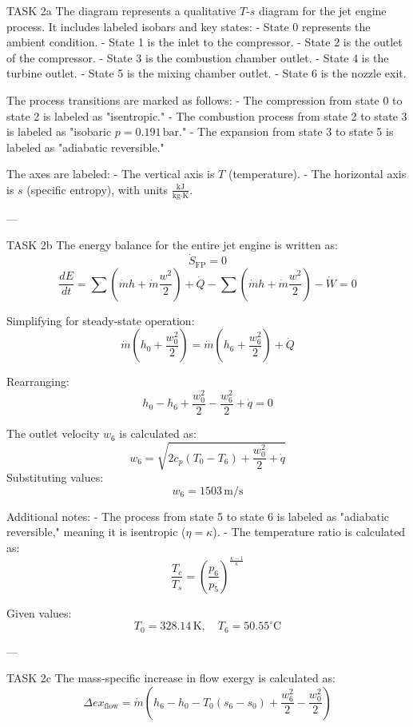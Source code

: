 TASK 2a  
The diagram represents a qualitative \( T \)-\( s \) diagram for the jet engine process. It includes labeled isobars and key states:  
- State 0 represents the ambient condition.  
- State 1 is the inlet to the compressor.  
- State 2 is the outlet of the compressor.  
- State 3 is the combustion chamber outlet.  
- State 4 is the turbine outlet.  
- State 5 is the mixing chamber outlet.  
- State 6 is the nozzle exit.  

The process transitions are marked as follows:  
- The compression from state 0 to state 2 is labeled as "isentropic."  
- The combustion process from state 2 to state 3 is labeled as "isobaric \( p = 0.191 \, \text{bar} \)."  
- The expansion from state 3 to state 5 is labeled as "adiabatic reversible."  

The axes are labeled:  
- The vertical axis is \( T \) (temperature).  
- The horizontal axis is \( s \) (specific entropy), with units \( \frac{\text{kJ}}{\text{kg·K}} \).  

---

TASK 2b  
The energy balance for the entire jet engine is written as:  
\[
\dot{S}_{\text{FP}} = 0  
\]  
\[
\frac{dE}{dt} = \sum (\dot{m} h + \dot{m} \frac{w^2}{2}) + \dot{Q} - \sum (\dot{m} h + \dot{m} \frac{w^2}{2}) - \dot{W} = 0  
\]  

Simplifying for steady-state operation:  
\[
\dot{m} \left( h_0 + \frac{w_0^2}{2} \right) = \dot{m} \left( h_6 + \frac{w_6^2}{2} \right) + \dot{Q}  
\]  

Rearranging:  
\[
h_0 - h_6 + \frac{w_0^2}{2} - \frac{w_6^2}{2} + \dot{q} = 0  
\]  

The outlet velocity \( w_6 \) is calculated as:  
\[
w_6 = \sqrt{2 c_p (T_0 - T_6) + \frac{w_0^2}{2} + \dot{q}}  
\]  
Substituting values:  
\[
w_6 = 1503 \, \text{m/s}  
\]  

Additional notes:  
- The process from state 5 to state 6 is labeled as "adiabatic reversible," meaning it is isentropic (\( \eta = \kappa \)).  
- The temperature ratio is calculated as:  
\[
\frac{T_c}{T_s} = \left( \frac{p_6}{p_5} \right)^{\frac{\kappa - 1}{\kappa}}  
\]  

Given values:  
\[
T_0 = 328.14 \, \text{K}, \quad T_6 = 50.55^\circ \text{C}  
\]  

---

TASK 2c  
The mass-specific increase in flow exergy is calculated as:  
\[
\Delta ex_{\text{flow}} = \dot{m} \left( h_6 - h_0 - T_0 (s_6 - s_0) + \frac{w_6^2}{2} - \frac{w_0^2}{2} \right)  
\]  

